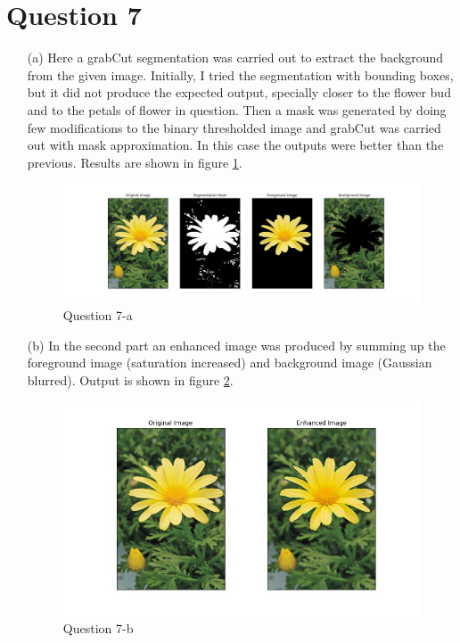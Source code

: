 \documentclass[11pt]{article}
\begin{document}
\section*{Question 7}

\begin{itemize}
    \item[(a)] Here a grabCut segmentation \cite{grabcut} was carried out to extract the background from the given image. Initially, I tried 
    the segmentation with bounding boxes, but it did not produce the expected output, specially closer to the flower bud and to the petals of flower 
    in question. Then a mask was generated by doing few modifications to the binary thresholded image and grabCut was carried out with mask approximation. 
    In this case the outputs were better than the previous. Results are shown in figure \ref{71}. 
                
    \begin{figure}[!h]
        \centering
        \includegraphics[width=\textwidth]{Images/71.jpg}
        \caption{Question 7-a}
        \label{71}
    \end{figure}

    \item[(b)] In the second part an enhanced image was produced by summing up the foreground image (saturation increased) and background image 
    (Gaussian blurred). Output is shown in figure \ref{72}. 
    
    \begin{figure}[!h]
        \centering
        \includegraphics[width=\textwidth]{Images/72.jpg}
        \caption{Question 7-b}
        \label{72}
    \end{figure}
        
\end{itemize} 
    
\newpage


\end{document}
